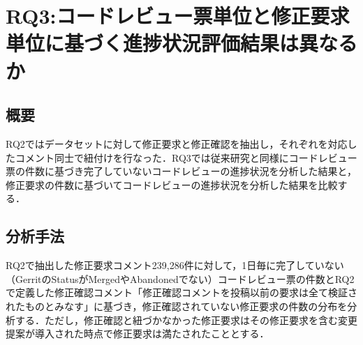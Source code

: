 \documentclass[submit,techrep,noauthor]{ipsj}
\newcommand{\RQThree}{コードレビュー票単位と修正要求単位に基づく進捗状況評価結果は異なるか}
\begin{document}
\begin{table}[t]
\centering
  \caption{定義毎に修正要求(239,286件)と紐づいた割合}
  \label{table:link_ratio}
\end{table}

\section{RQ3:\RQThree}\label{sec:RQ3}

\subsection{概要}
RQ2ではデータセットに対して修正要求と修正確認を抽出し，それぞれを対応したコメント同士で紐付けを行なった．RQ3では従来研究と同様にコードレビュー票の件数に基づき完了していないコードレビューの進捗状況を分析した結果と，修正要求の件数に基づいてコードレビューの進捗状況を分析した結果を比較する．


\subsection{分析手法}
RQ2で抽出した修正要求コメント239,286件に対して，1日毎に完了していない（GerritのStatusがMergedやAbandonedでない）コードレビュー票の件数とRQ2で定義した修正確認コメント「修正確認コメントを投稿以前の要求は全て検証されたものとみなす」に基づき，修正確認されていない修正要求の件数の分布を分析する．ただし，修正確認と紐づかなかった修正要求はその修正要求を含む変更提案が導入された時点で修正要求は満たされたこととする．

\end{document}
